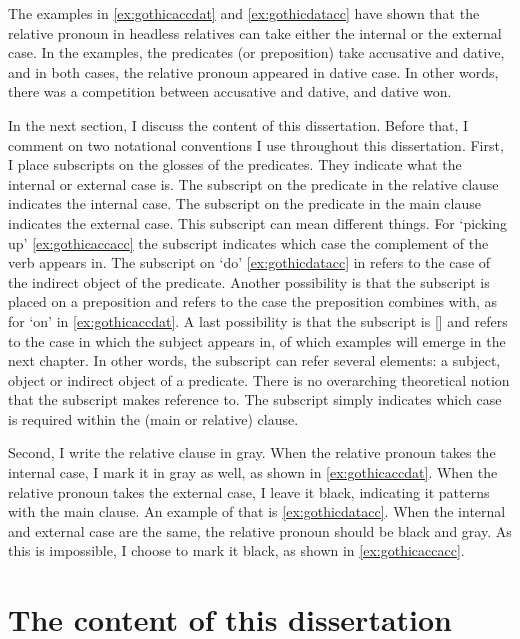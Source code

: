 The examples in \ref{ex:gothicaccdat} and \ref{ex:gothicdatacc} have shown that the relative pronoun in headless relatives can take either the internal or the external case. In the examples, the predicates (or preposition) take accusative and dative, and in both cases, the relative pronoun appeared in dative case. In other words, there was a competition between accusative and dative, and dative won.

In the next section, I discuss the content of this dissertation. Before that, I comment on two notational conventions I use throughout this dissertation. First, I place subscripts on the glosses of the predicates. They indicate what the internal or external case is. The subscript on the predicate in the relative clause indicates the internal case. The subscript on the predicate in the main clause indicates the external case. This subscript can mean different things.
For  `picking up' \ref{ex:gothicaccacc} the subscript indicates which case the complement of the verb appears in. The subscript on  `do' \ref{ex:gothicdatacc} in refers to the case of the indirect object of the predicate. Another possibility is that the subscript is placed on a preposition and refers to the case the preposition combines with, as for  `on' in \ref{ex:gothicaccdat}. A last possibility is that the subscript is [] and refers to the case in which the subject appears in, of which examples will emerge in the next chapter.
In other words, the subscript can refer several elements: a subject, object or indirect object of a predicate. There is no overarching theoretical notion that the subscript makes reference to. The subscript simply indicates which case is required within the (main or relative) clause.

Second, I write the relative clause in gray. When the relative pronoun takes the internal case, I mark it in gray as well, as shown in \ref{ex:gothicaccdat}. When the relative pronoun takes the external case, I leave it black, indicating it patterns with the main clause. An example of that is \ref{ex:gothicdatacc}. When the internal and external case are the same, the relative pronoun should be black and gray. As this is impossible, I choose to mark it black, as shown in \ref{ex:gothicaccacc}.


\section{The content of this dissertation}

